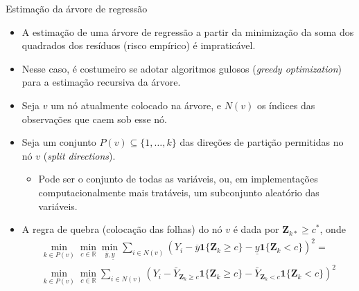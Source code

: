 \documentclass[11pt]{beamer}
\begin{document}
\begin{frame}{Estimação da árvore de regressão}
	\begin{itemize}
		\item A estimação de uma árvore de regressão a partir da minimização da soma dos quadrados dos resíduos (risco empírico) é impraticável.
		\item Nesse caso, é costumeiro se adotar algoritmos gulosos (\textit{greedy optimization}) para a estimação recursiva da árvore.
		\item Seja  $v$ um nó atualmente colocado na árvore, e $N(v)$ os índices das observações que caem sob esse nó.
		\item Seja um conjunto $P(v)\subseteq \{1,\ldots, k\}$ das direções de partição permitidas no nó $v$ (\textit{split directions}).
		\begin{itemize}
			\item Pode ser o conjunto de todas as variáveis, ou, em implementações computacionalmente mais tratáveis, um subconjunto aleatório das variáveis.
		\end{itemize}
		\item A regra de quebra (colocação das folhas) do nó $v$ é dada por $\boldsymbol{Z}_{k*}\geq c^*$, onde
		\begin{equation}
			\begin{aligned}
				\min_{k \in P(v)}\min_{c \in \mathbb{R}} \min_{\overline{y},\underline{y}} \sum_{i \in N(v)}(Y_i - \overline{y}\mathbf{1}\{\boldsymbol{Z}_k\geq c\} - \underline{y} \mathbf{1}\{\boldsymbol{Z}_k< c\})^2 = \\
					\min_{k \in P(v)}\min_{c \in \mathbb{R}} \sum_{i \in N(v)}(Y_i - \bar{Y}_{\boldsymbol{Z}_k\geq c} \mathbf{1}\{\boldsymbol{Z}_k\geq c\} - \bar{Y}_{\boldsymbol{Z}_k< c} \mathbf{1}\{\boldsymbol{Z}_k< c\})^2 
			\end{aligned}
		\end{equation}
	\end{itemize}
\end{frame}
\end{document}
